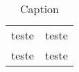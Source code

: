 \documentclass[casosdeuso.tex]{subfiles}
\begin{document}
\begin{table}
    \centering
    \begin{tabular}{cc}
         teste & teste \\
         teste &  teste \\
    \end{tabular}
    \caption{Caption}
    \label{tab:my_label}
\end{table}
\end{document}
